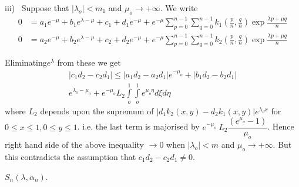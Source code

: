 iii)~ Suppose that $| \lambda_o | < m_1$ and $\mu_o \rightarrow +
  \infty$. We write 
  \begin{align*}
    0 & = a_1 e^{- \mu } + b_1 e^{\lambda - \mu} + c_1 + d_1 e^{-
      \mu}+ e^{-\mu}
    \sum_{p = 0}^{n-1} \sum_{q=0}^{n-1} k_1 \left(\frac{p}{n},\frac{q}{n}\right)
    \exp \frac{\lambda p + \mu q}{n}\\ 
    0 & = a_2 e^{- \mu } + b_2 e^{\lambda - \mu} + c_2 + d_2 e^{- \mu}
    + e^{-\mu}
    \sum_{p = 0}^{n-1} \sum_{q=0}^{n-1} k_2 \left(\frac{p}{n},\frac{q}{n}\right)
    \exp \frac{\lambda p + \mu q}{n} 
  \end{align*}

Eliminating\pageoriginale $e^\lambda$ from these we get
\begin{multline*}
  | c_1 d_2 - c_2 d_1 | \le | a_1 d_2 - a_2 d_1 | e^{- \mu_o} + | b_1
  d_2 - b_2 d_1 | \\
  e^{\lambda_o - \mu_o} + e^{-\mu_o} L_2 \int\limits_o^1
  \int\limits_o^1 e^{\mu_o \eta} d\xi d \eta 
\end{multline*}
where $L_2$ depends upon the supremum of $| d_1 k_2 (x,y) - d_2 k_1
(x,y) | e^{\lambda_o x}$ for $0 \le x \le 1, 0 \le y \le 1$. i.e. the
last term is majorised by $e^{-\mu_o} ~ L_2 \dfrac{(e^{\mu_o}
  -1)}{\mu_o}$. Hence right hand side of the above inequality
$\rightarrow 0$ when $| \lambda_o | < m$ and $\mu_o \rightarrow +
\infty$. But this contradicts the assumption that $c_1 d_2 - c_2 d_1
\neq 0$. 

 $S_n (\lambda,\alpha_n)$.

